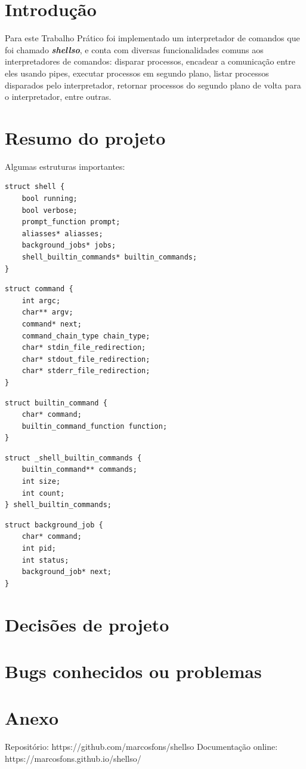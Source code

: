 \documentclass[a4paper, 12pt]{article}
\begin{document}
\newpage

\tableofcontents
\thispagestyle{empty}

\newpage
{}

\section{Introdução}
Para este Trabalho Prático foi implementado um interpretador de comandos que foi 
chamado \textbf{\textit{shellso}}, e conta com diversas 
funcionalidades comuns aos interpretadores de comandos: disparar processos, 
encadear a comunicação entre eles usando pipes, executar processos em segundo 
plano, listar processos disparados pelo interpretador, retornar processos do 
segundo plano de volta para o interpretador, entre outras.



\newpage

\section{Resumo do projeto}
Algumas estruturas importantes:

\begin{verbatim}
struct shell {
    bool running;
    bool verbose;
    prompt_function prompt;
    aliasses* aliasses;
    background_jobs* jobs;
    shell_builtin_commands* builtin_commands;
}
\end{verbatim}


\begin{verbatim}
struct command {
    int argc;                      
    char** argv;                    
    command* next;                  
    command_chain_type chain_type;  
    char* stdin_file_redirection;    
    char* stdout_file_redirection;   
    char* stderr_file_redirection;   
}
\end{verbatim}

\begin{verbatim}
struct builtin_command {
    char* command;
    builtin_command_function function;
}
\end{verbatim}

\begin{verbatim}
struct _shell_builtin_commands {
    builtin_command** commands;
    int size;
    int count;
} shell_builtin_commands;
\end{verbatim}

\begin{verbatim}
struct background_job {
    char* command;
    int pid;
    int status;
    background_job* next;
}
\end{verbatim}

\newpage

\section{Decisões de projeto}
\newpage

\section{Bugs conhecidos ou problemas}
\newpage

\section*{Anexo}
Repositório: https://github.com/marcosfons/shellso
Documentação online: https://marcosfons.github.io/shellso/
\end{document}
